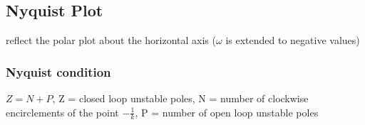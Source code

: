 \subsection{Nyquist Plot}
    reflect the polar plot about the horizontal axis ($\omega$ is extended to negative values)

    \subsubsection{Nyquist condition}
        $Z = N + P$, Z = closed loop unstable poles, N = number of clockwise encirclements of the point $-\frac{1}{k}$, P = number of open loop unstable poles